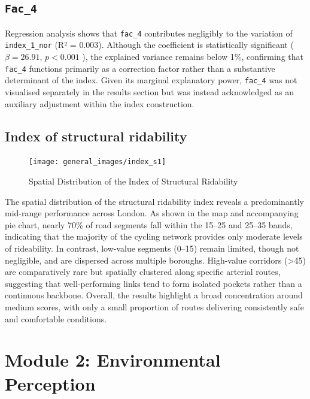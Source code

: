 \documentclass[
  12pt,
  oneside]{book}
\begin{document}
\subsection{\texorpdfstring{\texttt{Fac\_4}}{Fac\_4}}\label{fac_4}

Regression analysis shows that \texttt{fac\_4} contributes negligibly to the variation of \texttt{index\_1\_nor} (R² = 0.003). Although the coefficient is statistically significant ( \(\beta = 26.91\), \(p < 0.001\) ), the explained variance remains below 1\%, confirming that \texttt{fac\_4} functions primarily as a correction factor rather than a substantive determinant of the index. Given its marginal explanatory power, \texttt{fac\_4} was not visualised separately in the results section but was instead acknowledged as an auxiliary adjustment within the index construction.

\subsection{Index of structural ridability}\label{index-of-structural-ridability}

\begin{figure}

{\centering \texttt{[image: general\_images/index\_s1]} 

}

\caption{Spatial Distribution of the Index of Structural Ridability}\label{fig:indexs1}
\end{figure}

The spatial distribution of the structural ridability index reveals a predominantly mid-range performance across London. As shown in the map and accompanying pie chart, nearly 70\% of road segments fall within the 15--25 and 25--35 bands, indicating that the majority of the cycling network provides only moderate levels of rideability. In contrast, low-value segments (0--15) remain limited, though not negligible, and are dispersed across multiple boroughs. High-value corridors (\textgreater45) are comparatively rare but spatially clustered along specific arterial routes, suggesting that well-performing links tend to form isolated pockets rather than a continuous backbone. Overall, the results highlight a broad concentration around medium scores, with only a small proportion of routes delivering consistently safe and comfortable conditions.

\section{Module 2: Environmental Perception}\label{module-2-environmental-perception}
\end{document}
